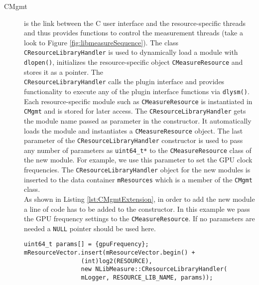 \begin{description}
\item[CMgmt] is the link between the C user interface and the resource-specific threads and thus provides functions to control the measurement threads (take a look to Figure \ref{fig:libmeasureSequence}). The class \texttt{CResourceLibraryHandler} is used to dynamically load a module with \texttt{dlopen()}, initializes the resource-specific object \texttt{CMeasureResource} and stores it as a pointer. The \\\texttt{CResourceLibraryHandler} calls the plugin interface and provides functionality to execute any of the plugin interface functions via \texttt{dlysm()}. Each resource-specific module such as \texttt{CMeasureResource} is instantiated in \texttt{CMgmt} and is stored for later access. The \texttt{CResourceLibraryHandler} gets the module name passed as parameter in the constructor. It automatically loads the module and instantiates a \texttt{CMeasureResource} object. The last parameter of the \texttt{CResourceLibraryHandler} constructor is used to pass any number of parameters as \texttt{uint64\_t*} to the \texttt{CMeasureResource} class of the new module. For example, we use this parameter to set the GPU clock frequencies. The \texttt{CResourceLibraryHandler} object for the new modules is inserted to the data container \texttt{mResources} which is a member of the \texttt{CMgmt} class.\\
As shown in Listing \ref{lst:CMgmtExtension}, in order to add the new module a line of code has to be added to the constructor. In this example we pass the GPU frequency settings to the \texttt{CMeasureResource}. If no parameters are needed a \texttt{NULL} pointer should be used here.
\begin{lstlisting}[caption={Extension to the \texttt{CMgmt} constructor.}, label=lst:CMgmtExtension]
uint64_t params[] = {gpuFrequency};
mResourceVector.insert(mResourceVector.begin() + 
				(int)log2(RESOURCE),
				new NLibMeasure::CResourceLibraryHandler(
				mLogger, RESOURCE_LIB_NAME,	params));
\end{lstlisting}


\end{description}
